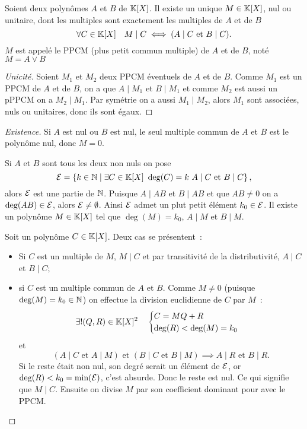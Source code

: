 \begin{prop}
  Soient deux polynômes \(A\) et \(B\) de \(\mathbb{K}[X]\). Il existe un unique \(M \in \mathbb{K}[X]\), nul ou unitaire, dont les multiples sont exactement les multiples de \(A\) et de \(B\)
  \begin{equation}
    \forall C \in \mathbb{K}[X] \quad M\mid{}C \iff (A\mid{}C \text{~et~} B\mid{}C).
  \end{equation}
  \(M\) est appelé le PPCM (plus petit commun multiple) de \(A\) et de \(B\), noté \(M=A \vee B\)
\end{prop}
\begin{proof}[Unicité]
  Soient \(M_1\) et \(M_2\) deux PPCM éventuels de \(A\) et de \(B\). Comme \(M_1\) est un PPCM de \(A\) et de \(B\), on a que \(A\mid{}M_1\) et \(B\mid{}M_1\) et comme \(M_2\) est aussi un pPPCM on a \(M_2\mid{}M_1\). Par symétrie on a aussi \(M_1\mid{}M_2\), alors \(M_1\) sont associées, nuls ou unitaires, donc ils sont égaux.
\end{proof}
\begin{proof}[Existence]
  Si \(A\) est nul ou \(B\) est nul, le seul multiple commun de \(A\) et \(B\) est le polynôme nul, donc \(M=0\).

  Si \(A\) et \(B\) sont tous les deux non nuls on pose
  \begin{equation}
    \E=\enstq{k \in \N}{\exists C \in \K[X] \ \deg(C)=k \ A\mid{}C \text{~et~} B\mid{}C},
  \end{equation}
  alors \(\mathcal{E}\) est une partie de \(\mathbb{N}\). Puisque \(A\mid{}AB\) et \(B\mid{}AB\) et que \(AB \neq 0\) on a \(\deg(AB) \in \mathcal{E}\), alors \(\mathcal{E}\neq \emptyset\). Ainsi \(\mathcal{E}\) admet un plut petit élément \(k_0 \in \mathcal{E}\). Il existe un polynôme \(M \in \mathbb{K}[X]\) tel que \(\deg(M)=k_0\), \(A\mid{}M\) et \(B\mid{}M\).

  Soit un polynôme \(C \in \mathbb{K}[X]\). Deux cas se présentent~:
  \begin{itemize}
  \item Si \(C\) est un multiple de \(M\), \(M\mid{}C\) et par transitivité de la distributivité, \(A\mid{}C\) et \(B\mid{}C\);
  \item si \(C\) est un multiple commun de \(A\) et \(B\). Comme \(M \neq 0\) (puisque \(\deg(M)=k_0 \in \mathbb{N}\)) on effectue la division euclidienne de \(C\) par \(M\)~:
    \begin{equation}
      \exists! (Q,R) \in \mathbb{K}[X]^2 \quad \begin{cases} C=MQ+R \\ \deg(R) < \deg(M)=k_0 \end{cases}
    \end{equation}
    et
    \begin{equation}
      (A\mid{}C \text{~et~} A\mid{}M) \text{~et~} (B\mid{}C \text{~et~} B\mid{}M) \implies A\mid{}R \text{~et~} B\mid{}R.
    \end{equation}
    Si le reste était non nul, son degré serait un élément de \(\mathcal{E}\), or \(\deg(R) < k_0 = \min(\mathcal{E})\), c'est absurde. Donc le reste est nul. Ce qui signifie que \(M\mid{}C\). Ensuite on divise \(M\) par son coefficient dominant pour avec le PPCM.
  \end{itemize}
\end{proof}

